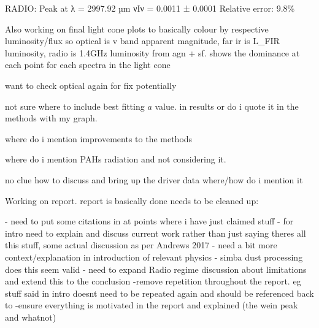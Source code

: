 \documentclass[a4paper, 11pt, oneside]{researchjournal} %
\begin{document}
RADIO:
Peak at λ = 2997.92 µm
νIν = 0.0011 ± 0.0001 
Relative error: 9.8\%

Also working on final light cone plots to basically colour by respective luminosity/flux so optical is v band apparent magnitude, far ir is L\_FIR luminosity, radio is 1.4GHz luminosity from agn + sf. shows the dominance at each point for each spectra in the light cone

want to check optical again for fix potentially

not sure where to include best fitting $a$ value. in results or do i quote it in the methods with my graph.

where do i mention improvements to the methods

where do i mention PAHs radiation and not considering it.

no clue how to discuss and bring up the driver data where/how do i mention it

Working on report. report is basically done needs to be cleaned up:

- need to put some citations in at points where i have just claimed stuff
- for intro need to explain and discuss current work rather than just saying theres all this stuff, some actual discussion as per Andrews 2017
- need a bit more context/explanation in introduction of relevant physics
- simba dust processing does this seem valid
- need to expand Radio regime discussion about limitations and extend this to the conclusion
-remove repetition throughout the report. eg stuff said in intro doesnt need to be repeated again and should be referenced back to 
-ensure everything is motivated in the report and explained (the wein peak and whatnot)







\end{document}

